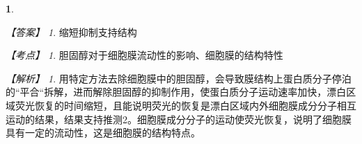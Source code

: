 \documentclass[UTF8, 10pt, a4paper, oneside]{ctexart}
\newcommand{\circled}[1]{{\small{\textcircled{\tiny{#1}}}}}%
\theoremstyle{definition}
\newtheorem{exercise}{}
\theoremstyle{remark}
\newtheorem*{answer}{【答案】}
\newtheorem*{point}{【考点】}      %
\newtheorem*{explanation}{【解析】}     %
\theoremstyle{plain}
\begin{document}
\begin{exercise}
    \begin{answer}
        缩短\qquad 抑制\qquad 支持\qquad 结构
    \end{answer}
    \begin{point}
        胆固醇对于细胞膜流动性的影响、细胞膜的结构特性
    \end{point}
    \begin{explanation}
        用特定方法去除细胞膜中的胆固醇，会导致膜结构上蛋白质分子停泊的“平合“拆解，进而解除胆固醇的抑制作用，使蛋白质分子运动速率加快，漂白区域荧光恢复的时间缩短，且能说明荧光的恢复是漂白区域内外细胞膜成分分子相互运动的结果，结果支持推测\circled{2}。细胞膜成分分子的运动使荧光恢复，说明了细胞膜具有一定的流动性，这是细胞膜的结构特点。
    \end{explanation}


\end{exercise}
\end{document}
